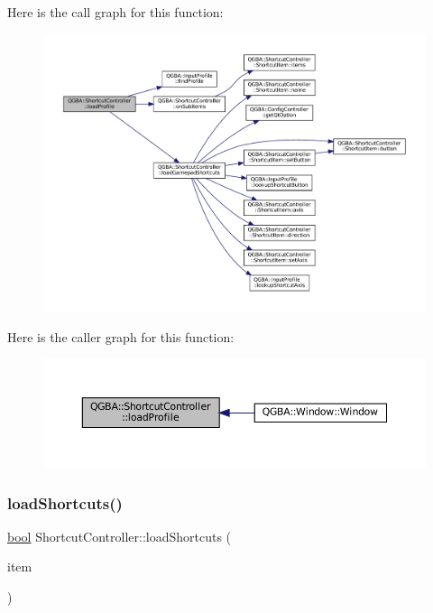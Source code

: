 Here is the call graph for this function\+:
\nopagebreak
\begin{figure}[H]
\begin{center}
\leavevmode
\includegraphics[width=350pt]{class_q_g_b_a_1_1_shortcut_controller_a9cef8d1b6210a7648f716467f80abd63_cgraph}
\end{center}
\end{figure}
Here is the caller graph for this function\+:
\nopagebreak
\begin{figure}[H]
\begin{center}
\leavevmode
\includegraphics[width=350pt]{class_q_g_b_a_1_1_shortcut_controller_a9cef8d1b6210a7648f716467f80abd63_icgraph}
\end{center}
\end{figure}
\mbox{\label{class_q_g_b_a_1_1_shortcut_controller_a91bd0c455902e715c0133b21a819dd12}} 
\subsubsection{\texorpdfstring{load\+Shortcuts()}{loadShortcuts()}}
{\footnotesize\ttfamily \mbox{\hyperlink{libretro_8h_a4a26dcae73fb7e1528214a068aca317e}{bool}} Shortcut\+Controller\+::load\+Shortcuts (\begin{DoxyParamCaption}\item[{\mbox{\hyperlink{class_q_g_b_a_1_1_shortcut_controller_1_1_shortcut_item}{Shortcut\+Item}} $\ast$}]{item }\end{DoxyParamCaption})\hspace{0.3cm}{\ttfamily [private]}}

